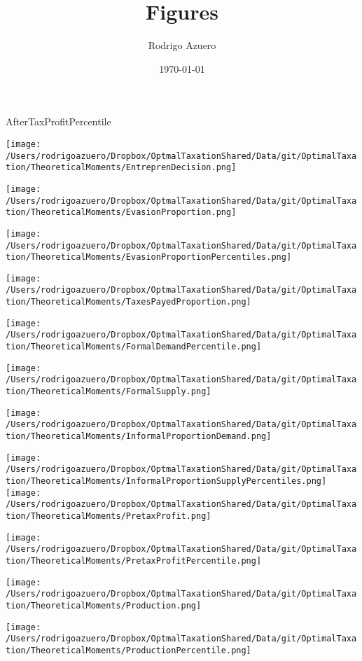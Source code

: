\documentclass[12pt]{article}
\title{\vspace{-3cm}Figures}
\author{Rodrigo Azuero}
\date{\today}
\begin{document}
\maketitle





\doublespacing
AfterTaxProfitPercentile


\texttt{[image: /Users/rodrigoazuero/Dropbox/OptmalTaxationShared/Data/git/OptimalTaxation/TheoreticalMoments/EntreprenDecision.png]}


\texttt{[image: /Users/rodrigoazuero/Dropbox/OptmalTaxationShared/Data/git/OptimalTaxation/TheoreticalMoments/EvasionProportion.png]}

\texttt{[image: /Users/rodrigoazuero/Dropbox/OptmalTaxationShared/Data/git/OptimalTaxation/TheoreticalMoments/EvasionProportionPercentiles.png]}

\texttt{[image: /Users/rodrigoazuero/Dropbox/OptmalTaxationShared/Data/git/OptimalTaxation/TheoreticalMoments/TaxesPayedProportion.png]}

\texttt{[image: /Users/rodrigoazuero/Dropbox/OptmalTaxationShared/Data/git/OptimalTaxation/TheoreticalMoments/FormalDemandPercentile.png]}

\texttt{[image: /Users/rodrigoazuero/Dropbox/OptmalTaxationShared/Data/git/OptimalTaxation/TheoreticalMoments/FormalSupply.png]}

\texttt{[image: /Users/rodrigoazuero/Dropbox/OptmalTaxationShared/Data/git/OptimalTaxation/TheoreticalMoments/InformalProportionDemand.png]}


\texttt{[image: /Users/rodrigoazuero/Dropbox/OptmalTaxationShared/Data/git/OptimalTaxation/TheoreticalMoments/InformalProportionSupplyPercentiles.png]}
\texttt{[image: /Users/rodrigoazuero/Dropbox/OptmalTaxationShared/Data/git/OptimalTaxation/TheoreticalMoments/PretaxProfit.png]}

\texttt{[image: /Users/rodrigoazuero/Dropbox/OptmalTaxationShared/Data/git/OptimalTaxation/TheoreticalMoments/PretaxProfitPercentile.png]}

\texttt{[image: /Users/rodrigoazuero/Dropbox/OptmalTaxationShared/Data/git/OptimalTaxation/TheoreticalMoments/Production.png]}

\texttt{[image: /Users/rodrigoazuero/Dropbox/OptmalTaxationShared/Data/git/OptimalTaxation/TheoreticalMoments/ProductionPercentile.png]}
\end{document}
